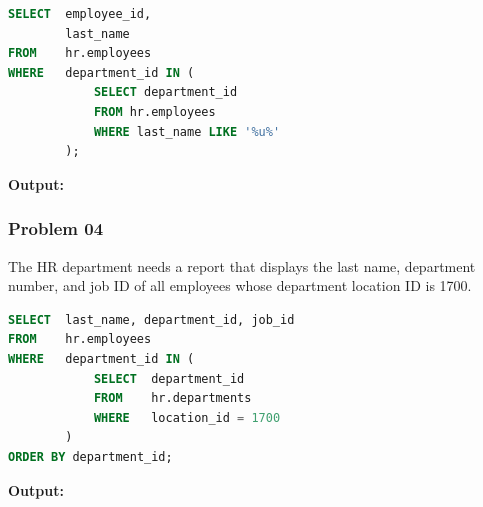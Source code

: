 \begin{frame}



\begin{lstlisting}[language=SQL]
SELECT 	employee_id,
       	last_name
FROM 	hr.employees
WHERE 	department_id IN (
   			SELECT department_id
   			FROM hr.employees
   			WHERE last_name LIKE '%u%'
		);
\end{lstlisting}
\textbf{Output: }
\end{frame}


\newpage
\subsubsection*{Problem 04}
The HR department needs a report that displays the last name, department number, and job ID of all employees whose department location ID is 1700.

\begin{frame}



\begin{lstlisting}[language=SQL]
SELECT 	last_name, department_id, job_id
FROM 	hr.employees
WHERE 	department_id IN (
   			SELECT 	department_id
   			FROM 	hr.departments
   			WHERE 	location_id = 1700
		)
ORDER BY department_id;
\end{lstlisting}
\textbf{Output: }
\end{frame}

